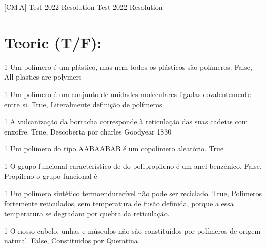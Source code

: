 \documentclass[\mainfilename]{subfiles}
\begin{document}

[CM\,A]
{Test 2022 Resolution} %
{Test 2022 Resolution} %

\part*{Teoric (T/F):}

\def\AT{\textcolor{green!40!foreground}{True}}
\def\AF{\textcolor{red!40!foreground}{False}}

\begin{questionBox}1{ %
    Um polímero é um plástico, mas nem todos os plásticos são polímeros.
} %
    \answer{}
    \AF{}, All plastics are polymers
\end{questionBox}
\begin{questionBox}1{ %
    Um polímero é um conjunto de unidades moleculares ligadas covalentemente entre si.
} %
    \answer{}
    \AT{}, Literalmente definição de polímeros
\end{questionBox}
\begin{questionBox}1{ %
    A vulcanização da borracha corresponde à reticulação das suas cadeias com enxofre.
} %
    \answer{}
    \AT{}, Descoberta por charles Goodyear 1830
\end{questionBox}
\begin{questionBox}1{ %
    Um polímero do tipo AABAABAB é um copolímero aleatório.
} %
    \answer{}
    \AT{}
\end{questionBox}
\begin{questionBox}1{ %
    O grupo funcional característico de do polipropileno é um anel benzénico.
} %
    \answer{}
    \AF{}, Propileno o grupo funcional é 
\end{questionBox}
\begin{questionBox}1{ %
    Um polímero sintético termoendurecível não pode ser reciclado. 
} %
    \answer{}
    \AT{}, Polímeros fortemente reticulados, sem
    temperatura de fusão definida, porque a essa
    temperatura se degradam por quebra da
    reticulação.
\end{questionBox}
\begin{questionBox}1{ %
    O nosso cabelo, unhas e músculos não são constituídos por polímeros de origem natural.
} %
    \answer{}
    \AF{}, Constituidos por Queratina
\end{questionBox}
\end{document}
